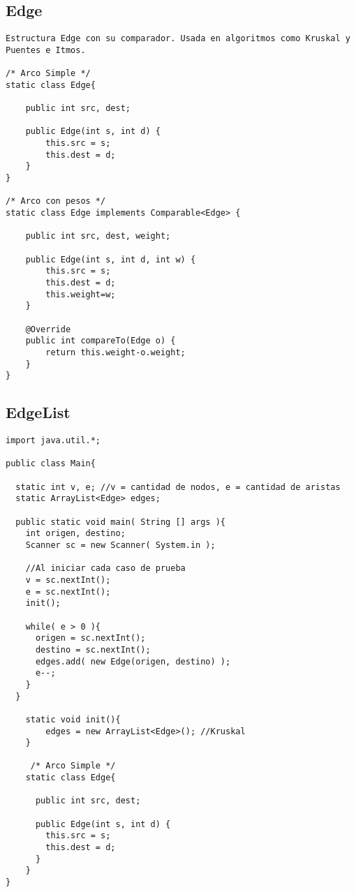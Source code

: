 \documentclass[10pt,letterpaper,twocolumn,twosided]{article}
\begin{document}
\subsection{Edge}
\begin{lstlisting}
Estructura Edge con su comparador. Usada en algoritmos como Kruskal y Puentes e Itmos.

/* Arco Simple */
static class Edge{

    public int src, dest;
    
    public Edge(int s, int d) {
        this.src = s;
        this.dest = d;
    }
}

/* Arco con pesos */
static class Edge implements Comparable<Edge> {

    public int src, dest, weight;
    
    public Edge(int s, int d, int w) {
        this.src = s;
        this.dest = d;
        this.weight=w;
    }
    
    @Override
    public int compareTo(Edge o) {
        return this.weight-o.weight;
    }
}\end{lstlisting}

\subsection{EdgeList}
\begin{lstlisting}
import java.util.*;

public class Main{
  
  static int v, e; //v = cantidad de nodos, e = cantidad de aristas
  static ArrayList<Edge> edges;
  
  public static void main( String [] args ){
    int origen, destino;
    Scanner sc = new Scanner( System.in );
    
    //Al iniciar cada caso de prueba
    v = sc.nextInt();
    e = sc.nextInt();
    init();
    
    while( e > 0 ){
      origen = sc.nextInt();
      destino = sc.nextInt();
      edges.add( new Edge(origen, destino) );
      e--;
    }
  }
  
	static void init(){
		edges = new ArrayList<Edge>(); //Kruskal
	}
  
	 /* Arco Simple */
	static class Edge{
	
	  public int src, dest;
	    
	  public Edge(int s, int d) {
	    this.src = s;
	    this.dest = d;
	  }
	}
}
\end{lstlisting}
\end{document}
